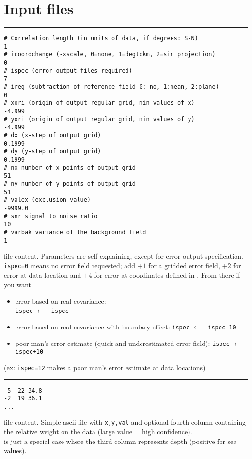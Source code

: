 \section{Input files}
\begin{multicols}{2}
{
\begin{minipage}{.5\textwidth}
\rule{\textwidth}{10pt}
{\tiny{
\begin{verbatim}
# Correlation length (in units of data, if degrees: S-N)
1
# icoordchange (-xscale, 0=none, 1=degtokm, 2=sin projection)
0
# ispec (error output files required)
7
# ireg (subtraction of reference field 0: no, 1:mean, 2:plane)
0
# xori (origin of output regular grid, min values of x)
-4.999
# yori (origin of output regular grid, min values of y)
-4.999
# dx (x-step of output grid)
0.1999
# dy (y-step of output grid)
0.1999
# nx number of x points of output grid
51
# ny number of y points of output grid
51
# valex (exclusion value)
-9999.0
# snr signal to noise ratio 
10
# varbak variance of the background field
1\end{verbatim}
}}
\vspace*{-0.5cm}
\makebox[\textwidth]{\hrulefill}
{ file content. Parameters are self-explaining, except for error output specification. {\tt ispec=0} means no error field requested; add $+1$ for a gridded error field, $+2$ for error at data location and $+4$ for error at coordinates defined in .
From there if you want \begin{itemize}
\footnotesize
\item error based on real covariance:\\ {\tt ispec} $\leftarrow$ {\tt -ispec}
\item error based on real covariance with boundary effect: {\tt ispec} $\leftarrow$ {\tt -ispec-10}
\item poor man's error estimate (quick and underestimated error field): {\tt ispec} $\leftarrow$ {\tt ispec+10}
\end{itemize}
\footnotesize{(ex: {\tt ispec=12} makes a poor man's error estimate at data locations) }}
\end{minipage}
}

\begin{minipage}{.5\textwidth}
\rule{\textwidth}{10pt}
{\scriptsize{
\begin{verbatim}
-5  22 34.8
-2  19 36.1
...
\end{verbatim}
}}
\vspace*{-0.5cm}
\makebox[\textwidth]{\hrulefill}
{ file content. Simple ascii file with {\tt x,y,val} and optional fourth column containing the relative weight on the data (large value = high confidence)}.\\
 is just a special case where the third column represents depth (positive for sea values).
\end{minipage}


\end{multicols}
